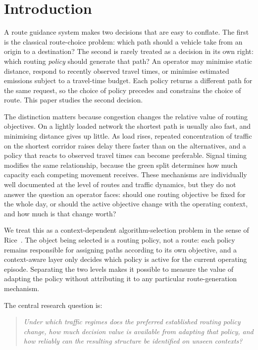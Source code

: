 \documentclass[runningheads]{llncs}
\begin{document}
\section{Introduction}

A route guidance system makes two decisions that are easy to conflate. The first is
the classical route-choice problem: which path should a vehicle take from an origin to
a destination? The second is rarely treated as a decision in its own right: which
routing \emph{policy} should generate that path? An operator may minimise static
distance, respond to recently observed travel times, or minimise estimated emissions
subject to a travel-time budget. Each policy returns a different path for the same
request, so the choice of policy precedes and constrains the choice of route. This
paper studies the second decision.

The distinction matters because congestion changes the relative value of routing
objectives. On a lightly loaded network the shortest path is usually also fast, and
minimising distance gives up little. As load rises, repeated concentration of traffic
on the shortest corridor raises delay there faster than on the alternatives, and a
policy that reacts to observed travel times can become preferable. Signal timing
modifies the same relationship, because the green split determines how much capacity
each competing movement receives. These mechanisms are individually well documented at
the level of routes and traffic dynamics, but they do not answer the question an
operator faces: should one routing objective be fixed for the whole day, or should the
active objective change with the operating context, and how much is that change worth?

We treat this as a context-dependent algorithm-selection problem in the sense of
Rice~\cite{rice1976algorithm}. The object being selected is a routing policy, not a
route: each policy remains responsible for assigning paths according to its own
objective, and a context-aware layer only decides which policy is active for the
current operating episode. Separating the two levels makes it possible to measure the
value of adapting the policy without attributing it to any particular route-generation
mechanism.

The central research question is:

\begin{quote}
\emph{Under which traffic regimes does the preferred established routing policy
change, how much decision value is available from adapting that policy, and how
reliably can the resulting structure be identified on unseen contexts?}
\end{quote}
\end{document}

